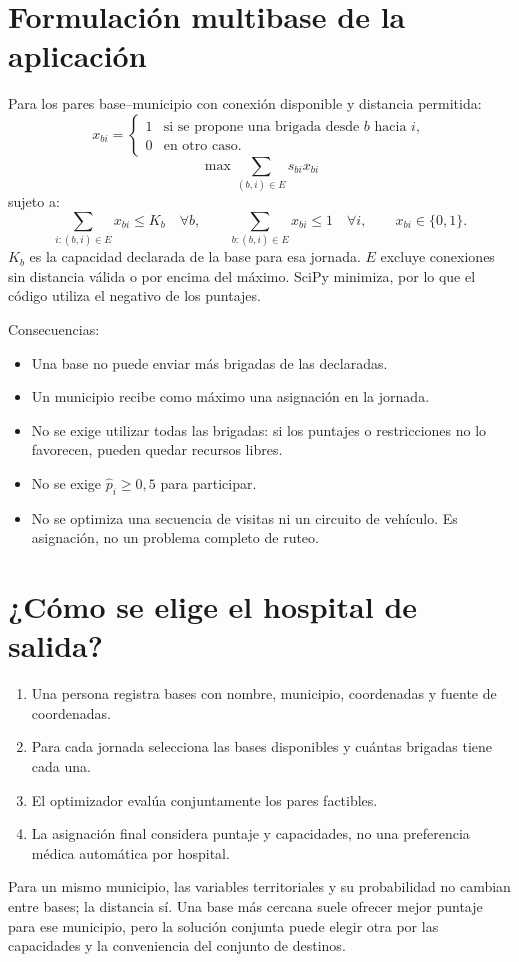 \documentclass[11pt,a4paper]{report}
\begin{document}
\section{Formulación multibase de la aplicación}
Para los pares base--municipio con conexión disponible y distancia permitida:
\[
x_{bi}=
\begin{cases}
1 & \text{si se propone una brigada desde }b\text{ hacia }i,\\
0 & \text{en otro caso}.
\end{cases}
\]
\[
\max \sum_{(b,i)\in E}s_{bi}x_{bi}
\]
sujeto a:
\[
\sum_{i:(b,i)\in E}x_{bi}\leq K_b\quad\forall b,
\qquad
\sum_{b:(b,i)\in E}x_{bi}\leq1\quad\forall i,
\qquad x_{bi}\in\{0,1\}.
\]
$K_b$ es la capacidad declarada de la base para esa jornada. $E$ excluye conexiones sin distancia válida o por encima del máximo. SciPy minimiza, por lo que el código utiliza el negativo de los puntajes.

Consecuencias:
\begin{itemize}
\item Una base no puede enviar más brigadas de las declaradas.
\item Un municipio recibe como máximo una asignación en la jornada.
\item No se exige utilizar todas las brigadas: si los puntajes o restricciones no lo favorecen, pueden quedar recursos libres.
\item No se exige $\hat p_i\geq0,5$ para participar.
\item No se optimiza una secuencia de visitas ni un circuito de vehículo. Es asignación, no un problema completo de ruteo.
\end{itemize}

\section{¿Cómo se elige el hospital de salida?}
\begin{enumerate}
\item Una persona registra bases con nombre, municipio, coordenadas y fuente de coordenadas.
\item Para cada jornada selecciona las bases disponibles y cuántas brigadas tiene cada una.
\item El optimizador evalúa conjuntamente los pares factibles.
\item La asignación final considera puntaje y capacidades, no una preferencia médica automática por hospital.
\end{enumerate}
Para un mismo municipio, las variables territoriales y su probabilidad no cambian entre bases; la distancia sí. Una base más cercana suele ofrecer mejor puntaje para ese municipio, pero la solución conjunta puede elegir otra por las capacidades y la conveniencia del conjunto de destinos.
\end{document}

